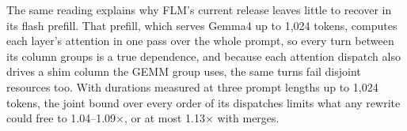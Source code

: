 The same reading explains why FLM's current release leaves little to recover in its flash prefill.
That prefill, which serves Gemma4 up to 1{,}024 tokens, computes each layer's attention in one pass over the whole prompt, so every turn between its column groups is a true dependence, and because each attention dispatch also drives a shim column the GEMM group uses, the same turns fail disjoint resources too.
With durations measured at three prompt lengths up to 1{,}024 tokens, the joint bound over every order of its dispatches limits what any rewrite could free to 1.04--1.09$\times$, or at most 1.13$\times$ with merges.
